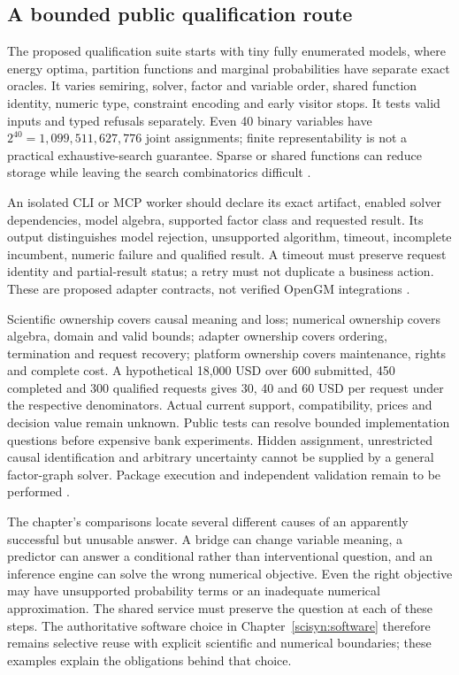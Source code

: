\subsection{A bounded public qualification route}
The proposed qualification suite starts with tiny fully enumerated models,
where energy optima, partition functions and marginal probabilities have
separate exact oracles. It varies semiring, solver, factor and variable
order, shared function identity, numeric type, constraint encoding and
early visitor stops. It tests valid inputs and typed refusals separately.
Even 40 binary variables have $2^{40}=1{,}099{,}511{,}627{,}776$ joint
assignments; finite representability is not a practical exhaustive-search
guarantee. Sparse or shared functions can reduce storage while leaving
the search combinatorics difficult \cite{exec24_opengm_choice}.

An isolated CLI or MCP worker should declare its exact artifact, enabled
solver dependencies, model algebra, supported factor class and requested
result. Its output distinguishes model rejection, unsupported algorithm,
timeout, incomplete incumbent, numeric failure and qualified result. A
timeout must preserve request identity and partial-result status; a retry
must not duplicate a business action. These are proposed adapter contracts,
not verified OpenGM integrations \cite{exec24_opengm_choice}.

Scientific ownership covers causal meaning and loss; numerical ownership
covers algebra, domain and valid bounds; adapter ownership covers ordering,
termination and request recovery; platform ownership covers maintenance,
rights and complete cost. A hypothetical 18,000 USD over 600 submitted,
450 completed and 300 qualified requests gives 30, 40 and 60 USD per request
under the respective denominators. Actual current support, compatibility,
prices and decision value remain unknown. Public tests can resolve bounded
implementation questions before expensive bank experiments. Hidden
assignment, unrestricted causal identification and arbitrary uncertainty
cannot be supplied by a general factor-graph solver. Package execution and
independent validation remain to be performed
\cite{exec24_opengm_choice}.

The chapter's comparisons locate several different causes of an apparently
successful but unusable answer. A bridge can change variable meaning, a
predictor can answer a conditional rather than interventional question, and
an inference engine can solve the wrong numerical objective. Even the right
objective may have unsupported probability terms or an inadequate numerical
approximation. The shared service must preserve the question at each of
these steps. The authoritative software choice in
Chapter~\ref{scisyn:software} therefore remains selective reuse with explicit
scientific and numerical boundaries; these examples explain the obligations
behind that choice.

